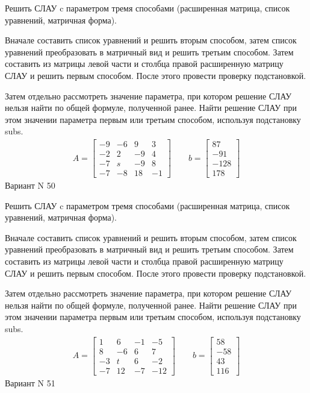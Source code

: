\documentclass[11pt]{report}
\begin{document}
Решить СЛАУ c параметром тремя способами (расширенная матрица, список уравнений, матричная форма).

Вначале составить список уравнений и решить вторым способом,
затем список уравнений преобразовать в матричный вид и решить третьим способом.
Затем составить из матрицы левой части и столбца правой расширенную матрицу СЛАУ и решить первым способом.
После этого провести проверку подстановкой.

Затем отдельно рассмотреть значение параметра, при котором решение СЛАУ нельзя найти по общей формуле,
полученной ранее.
Найти решение СЛАУ при этом значении параметра первым или третьим способом, используя подстановку subs.
\begin{align*}
    A = \left[\begin{matrix}-9 & -6 & 9 & 3\\-2 & 2 & -9 & 4\\-7 & s & -9 & 8\\-7 & -8 & 18 & -1\end{matrix}\right]
\qquad b = \left[\begin{matrix}87\\-91\\-128\\178\end{matrix}\right]
\end{align*}
\newpage
Вариант N 50


Решить СЛАУ c параметром тремя способами (расширенная матрица, список уравнений, матричная форма).

Вначале составить список уравнений и решить вторым способом,
затем список уравнений преобразовать в матричный вид и решить третьим способом.
Затем составить из матрицы левой части и столбца правой расширенную матрицу СЛАУ и решить первым способом.
После этого провести проверку подстановкой.

Затем отдельно рассмотреть значение параметра, при котором решение СЛАУ нельзя найти по общей формуле,
полученной ранее.
Найти решение СЛАУ при этом значении параметра первым или третьим способом, используя подстановку subs.
\begin{align*}
    A = \left[\begin{matrix}1 & 6 & -1 & -5\\8 & -6 & 6 & 7\\-3 & t & 6 & -2\\-7 & 12 & -7 & -12\end{matrix}\right]
\qquad b = \left[\begin{matrix}58\\-58\\43\\116\end{matrix}\right]
\end{align*}
\newpage
Вариант N 51
\end{document}
